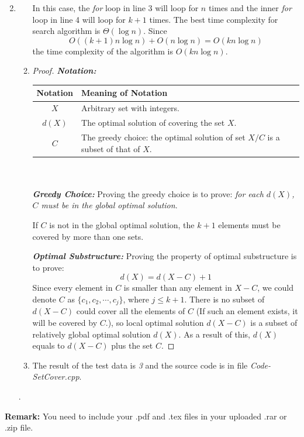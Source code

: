\documentclass[12pt,a4paper]{article}
\makeatletter
\newtheorem*{solution}{Solution}
\theoremstyle{definition}
\renewenvironment{solution}[1][Solution] {\par\pushQED{\qed}\normalfont\topsep6\p@\@plus6\p@\relax\trivlist\item[\hskip\labelsep\bfseries#1\@addpunct{.}]\ignorespaces}{\popQED\endtrivlist\@endpefalse} \makeatother
\makeatother
\begin{document}
\begin{enumerate}
\begin{solution}
\begin{enumerate}
    In this case, the \emph{for} loop in line 3 will loop for $n$ times and the inner \emph{for} loop in line 4 will loop for $k+1$ times. The best time complexity for search algorithm is $\Theta(\log n)$. Since 
    $$O((k+1)n\log n)+O(n\log n)=O(kn\log n)$$ 
    the time complexity of the algorithm is \textbf{$O(kn\log n)$}.
    \item
    \begin{proof}
    \textbf{\textit{Notation:}}\\
    \begin{tabular}{| c | l |}
    \hline    
    Notation & Meaning of Notation\\    
    \hline
    $X$ & Arbitrary set with integers.\\
    $d(X)$ & The optimal solution of covering the set $X$.\\
    $C$ & The greedy choice: the optimal solution of set $X/C$ is a subset of that of $X$.\\    
    \hline
    \end{tabular}
  	\\
  	\\
    \textbf{\textit{Greedy Choice:}}
    Proving the greedy choice is to prove: \textit{for each $d(X)$, $C$ must be in the global optimal solution}.
    
    If $C$ is not in the global optimal solution, the $k+1$ elements must be covered by more than one sets. 
        
    \textbf{\textit{Optimal Substructure:}}
    Proving the property of optimal substructure is to prove: 
    $$d(X)=d(X-C)+1$$
    Since every element in $C$ is smaller than any element in $X-C$, we could denote $C$ as $\{c_1,c_2,\cdots,c_j\}$, where $j\leq k+1$. There is no subset of $d(X-C)$ could cover all the elements of $C$ (If such an element exists, it will be covered by $C$.), so local optimal solution $d(X-C)$ is a subset of relatively global optimal solution $d(X)$. As a result of this, $d(X)$ equals to $d(X-C)$ plus the set $C$.
    
    \end{proof}
    
    \item The result of the test data is \emph{3} and the source code is in file \textit{Code-SetCover.cpp}.

    \end{enumerate}.
    \end{solution}
\end{enumerate}



\vspace{20pt}

\textbf{Remark:} You need to include your .pdf and .tex files in your uploaded .rar or .zip file.

\end{document}
